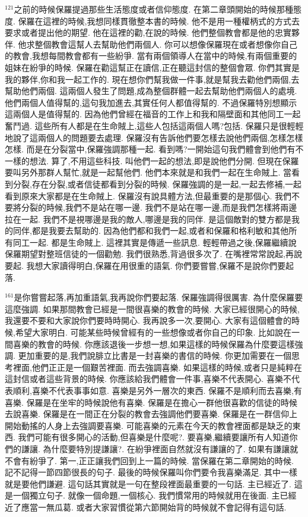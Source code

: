 \documentclass{book}
\begin{document}
$^{121}$之前的時候保羅提過那些生活態度或者信仰態度.
在第二章頭開始的時候那種態度.
保羅在這裡的時候,我想同樣貫徹整本書的時候.
他不是用一種權柄式的方式去要求或者提出他的期望.
他在這裡的勸,在說的時候.
他們整個教會都是他的忠實夥伴.
他求整個教會這幫人去幫助他們兩個人.
你可以想像保羅現在或者想像你自己的教會,我想每間教會都有一些紛爭.
當有兩個領導人在當中的時候,有兩個重要的姐妹在紛爭的時候.
保羅在勸這幫正在讀信,正在聽這封信的整個會眾.
你們其實是我的夥伴,你和我一起工作的.
現在想你們幫我做一件事,就是幫我去勸他們兩個,去幫助他們兩個.
這兩個人發生了問題,成為整個群體一起去幫助他們兩個人的處境.
他們兩個人值得幫的,這句我加進去,其實任何人都值得幫的.
不過保羅特別想顯示這兩個人是值得幫的.
因為他們曾經在福音的工作上和我和隔壁面和其他同工一起奮鬥過.
這些所有人都是在生命賊上,這些人包括這兩個人嗎?包括.
保羅只是很輕輕地說了這兩個人的問題要去處理.
保羅沒有告訴他們要怎樣去說他們兩個,怎樣怎樣怎樣.
而是在分裂當中,保羅強調那種一起.
看到嗎?一開始這句我們體會到他們有不一樣的想法.
算了,不用這些科技.
叫他們一起的想法,即是說他們分開.
但現在保羅要叫另外那群人幫忙,就是一起幫他們.
他們本來就是和我們一起在生命賊上.
當看到分裂,存在分裂,或者信徒都看到分裂的時候.
保羅強調的是一起,一起去修補,一起看到原來大家都是在生命賊上.
保羅沒有說具體方法,但最重要的是那個心.
我們不要將分裂的時候,我們不是站在哪一邊.
我們不是站在哪一邊,而是我們怎樣將兩邊拉在一起.
我們不是視哪邊是我的敵人,哪邊是我的同伴.
是這個敵對的雙方都是我的同伴,都是我要去幫助的.
因為他們都和我們一起,或者和保羅和格利敏和其他所有同工一起.
都是生命賊上.
這裡其實是傳遞一些訊息.
輕輕帶過之後,保羅繼續說保羅期望對整班信徒的一個勸勉.
我們很熟悉,背過很多次了.
在嘴裡常常說起,再說要起.
我想大家讀得明白,保羅在用很重的語氣.
你們要嘗嘗,保羅不是說你們要起落.

$^{161}$是你嘗嘗起落,再加重語氣,我再說你們要起落.
保羅強調得很厲害.
為什麼保羅要這麼強調.
如果那間教會已經是一間很喜樂的教會的時候.
大家已經很開心的時候,我還要不要和大家說你們要時時開心.
我再說多一次,要開心.
大家有這個體會的時候,希望大家明白.
可能某些時候曾經有的一些想像或者你自己的印象.
比如說在一間喜樂的教會的時候.
你應該退後一步想一想,如果這樣的時候保羅為什麼要這樣強調.
更加重要的是,我們說腓立比書是一封喜樂的書信的時候.
你更加需要在一個思考裡面,他們正正是一個艱苦裡面.
而去強調喜樂.
如果這樣的時候,或者只是純粹在這封信或者這些背景的時候.
你應該給我們體會一件事,喜樂不代表開心.
喜樂不代表順利,喜樂不代表事事如意.
喜樂是另外一層次的東西.
保羅不是順利而去喜樂,有喜樂.
保羅是在坐牢的時候說他有喜樂.
保羅是在擔心一群他很喜歡的信徒的時候去說喜樂.
保羅是在一間正在分裂的教會去強調他們要喜樂.
保羅是在一群信仰上開始動搖的人身上去強調要喜樂.
可能喜樂的元素在今天的教會裡面都是缺乏的東西.
我們可能有很多開心的活動,但喜樂是什麼呢?.
要喜樂,繼續要讓所有人知道你們的謙讓.
為什麼要特別提謙讓?.
在紛爭裡面自然就沒有謙讓的了.
如果有謙讓就不會有紛爭了.
第一,正正讓我們回到上一篇的時候.
當保羅在第二章開始的時候.
記不記得一節四節很長的句子.
最後的時候保羅叫你們要令我喜樂滿足.
其中一樣就是要他們謙避.
這句話其實就是一句在整段裡面最重要的一句話.
主已經近了.
這是一個獨立句子.
就像一個命題,一個核心.
我們慣常用的時候就用在後面.
主已經近了應當一無瓜葛.
或者大家習慣從第六節開始背的時候就不會記得有這句話.
\end{document}
